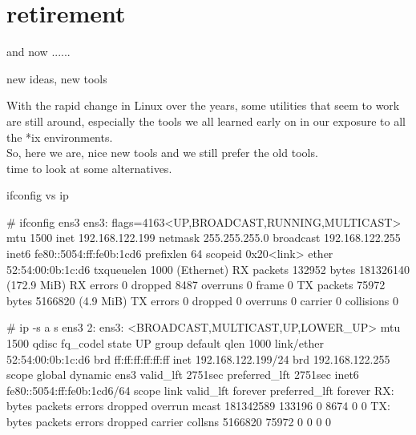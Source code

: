 \cprotect\note{ 

}

\section{retirement}


\begin{frame}
	{and now  ......}


\end{frame}

\cprotect\note{


}	

\begin{frame} 
	{new ideas, new tools} 

	With the rapid change in Linux over the years, some 
	utilities that seem to work are still around, especially the 
	tools we all learned early on in our exposure to all the 
	*ix environments. \\
	So, here we are, nice new tools and we still prefer the old tools. 
			\\ 
	time to look at some alternatives.
	
\end{frame}

\cprotect\note{

	}

\begin{frame}
	{ifconfig vs ip} 
	\begin{rawsmall}
[root@rt ~]# ifconfig ens3
ens3: flags=4163<UP,BROADCAST,RUNNING,MULTICAST>  mtu 1500
        inet 192.168.122.199  netmask 255.255.255.0  broadcast 192.168.122.255
        inet6 fe80::5054:ff:fe0b:1cd6  prefixlen 64  scopeid 0x20<link>
        ether 52:54:00:0b:1c:d6  txqueuelen 1000  (Ethernet)
        RX packets 132952  bytes 181326140 (172.9 MiB)
        RX errors 0  dropped 8487  overruns 0  frame 0
        TX packets 75972  bytes 5166820 (4.9 MiB)
        TX errors 0  dropped 0 overruns 0  carrier 0  collisions 0
	\end{rawsmall}
	\begin{rawsmall}
[root@rt ~]# ip -s  a s  ens3
2: ens3: <BROADCAST,MULTICAST,UP,LOWER_UP> mtu 1500 qdisc fq_codel state UP group default qlen 1000
    link/ether 52:54:00:0b:1c:d6 brd ff:ff:ff:ff:ff:ff
    inet 192.168.122.199/24 brd 192.168.122.255 scope global dynamic ens3
       valid_lft 2751sec preferred_lft 2751sec
    inet6 fe80::5054:ff:fe0b:1cd6/64 scope link 
       valid_lft forever preferred_lft forever
    RX: bytes  packets  errors  dropped overrun mcast   
    181342589  133196   0       8674    0       0       
    TX: bytes  packets  errors  dropped carrier collsns 
    5166820    75972    0       0       0       0   
	\end{rawsmall}

\end{frame}


